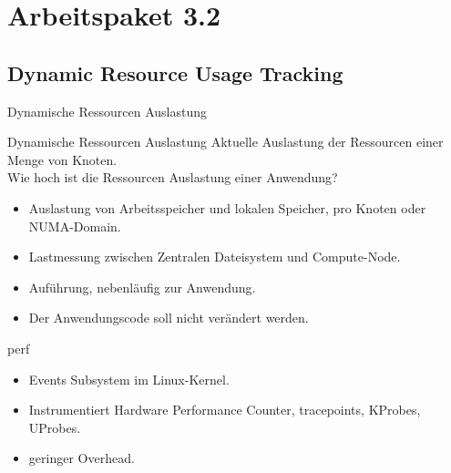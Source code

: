\section{Arbeitspaket 3.2}

\subsection{Dynamic Resource Usage Tracking}

\begin{frame}{Dynamische Ressourcen Auslastung}
    \begin{block}{Dynamische Ressourcen Auslastung}
        Aktuelle Auslastung der Ressourcen einer Menge von Knoten.\\
        Wie hoch ist die Ressourcen Auslastung einer Anwendung?
    \end{block}
    \begin{itemize}
        \item Auslastung von Arbeitsspeicher und lokalen Speicher, pro Knoten
            oder NUMA-Domain.
        \item Lastmessung zwischen Zentralen Dateisystem und Compute-Node.
        \item Auf\"{u}hrung, nebenl\"{a}ufig zur Anwendung.
        \item Der Anwendungscode soll nicht ver\"{a}ndert werden.
    \end{itemize}
\end{frame}


\begin{frame}{perf}

    \begin{itemize}
        \item Events Subsystem im Linux-Kernel.
        \item Instrumentiert Hardware Performance Counter, tracepoints, KProbes,
            UProbes.
        \item geringer Overhead.
    \end{itemize}

\end{frame}


